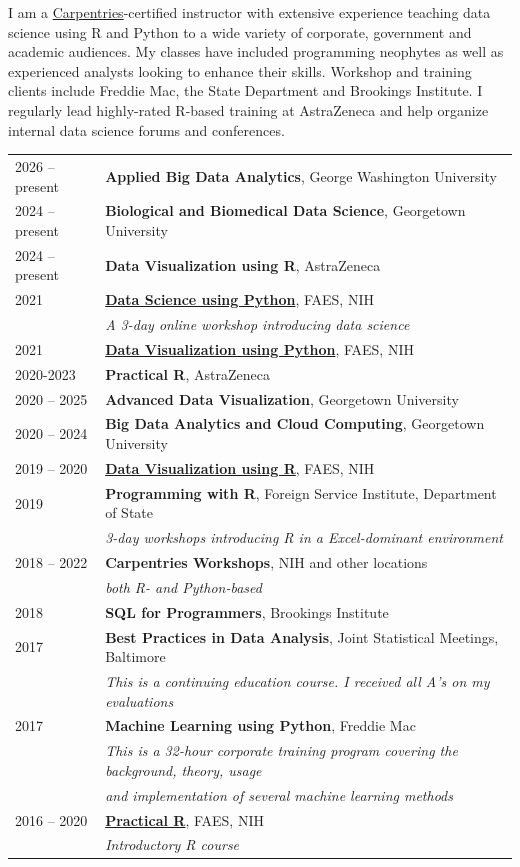 \documentclass[10pt,letterpaper,]{article}
\begin{document}
I am a \href{https://www.carpentries.org}{Carpentries}-certified
instructor with extensive experience teaching data science using R and
Python to a wide variety of corporate, government and academic
audiences. My classes have included programming neophytes as well as
experienced analysts looking to enhance their skills. Workshop and
training clients include Freddie Mac, the State Department and Brookings
Institute. I regularly lead highly-rated R-based training at AstraZeneca
and help organize internal data science forums and conferences.

\begin{tabular}{ll}
  2026 -- present & \textbf{Applied Big Data Analytics}, George Washington University \\ 
  2024 -- present & \textbf{Biological and Biomedical Data Science}, Georgetown University \\ 
  2024 -- present & \textbf{Data Visualization using R}, AstraZeneca \\ 
  2021 & \href{https://www.araastat.com/BIOF085}{\textbf{Data Science using Python}}, FAES, NIH \\ 
   & \emph{A 3-day online workshop introducing data science} \\ 
  2021 & \href{https://www.araastat.com/BIOF440}{\textbf{Data Visualization using Python}}, FAES, NIH \\ 
  2020-2023 & \textbf{Practical R}, AstraZeneca \\ 
  2020 -- 2025 & \textbf{Advanced Data Visualization}, Georgetown University \\ 
  2020 -- 2024 & \textbf{Big Data Analytics and Cloud Computing}, Georgetown University \\ 
  2019 -- 2020 & \href{https://www.araastat.com/BIOF439}{\textbf{Data Visualization using R}}, FAES, NIH \\ 
  2019 & \textbf{Programming with R}, Foreign Service Institute, Department of State \\ 
   & \emph{3-day workshops introducing R in a Excel-dominant environment} \\ 
  2018 -- 2022 & \textbf{Carpentries Workshops}, NIH and other locations \\ 
   & \emph{both R- and Python-based} \\ 
  2018 & \textbf{SQL for Programmers}, Brookings Institute \\ 
  2017 & \textbf{Best Practices in Data Analysis}, Joint Statistical Meetings, Baltimore \\ 
   & \emph{This is a continuing education course. I received all A's on my evaluations} \\ 
  2017 & \textbf{Machine Learning using Python}, Freddie Mac \\ 
   & \emph{This is a 32-hour corporate training program covering the background, theory, usage } \\ 
   & \emph{and implementation of several machine learning methods} \\ 
  2016 -- 2020 & \href{https://www.araastat.com/BIOF339}{\textbf{Practical R}}, FAES, NIH \\ 
   & \emph{Introductory R course} \\ 
  \end{tabular}
\end{document}

